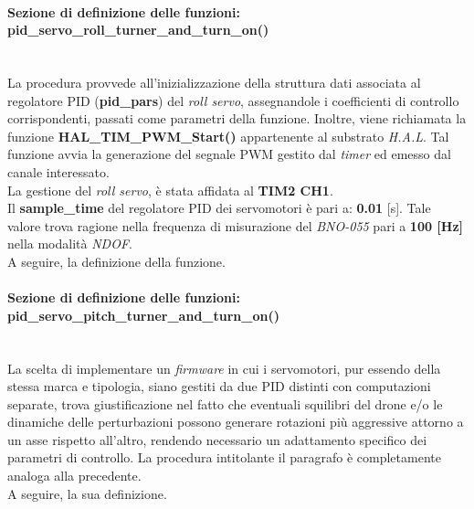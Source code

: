 \paragraph{Sezione di definizione delle funzioni: pid\_servo\_roll\_turner\_and\_turn\_on()}\mbox{}\\
\label{pidServoTurnerTurnOn}
La procedura provvede all'inizializzazione della struttura dati associata al regolatore PID (\textbf{pid\_pars}) del \textit{roll servo}, assegnandole i coefficienti di controllo corrispondenti, passati come parametri della funzione.
Inoltre, viene richiamata la funzione \textbf{HAL\_TIM\_PWM\_Start()} appartenente al substrato \textit{H.A.L}. Tal funzione avvia la generazione del segnale PWM gestito dal \textit{timer} ed emesso dal canale interessato.\\
La gestione del \textit{roll servo}, è stata affidata al \textbf{TIM2 CH1}.\\
Il \textbf{sample\_time} del regolatore PID dei servomotori è pari a: \textbf{0.01} [s]. Tale valore trova ragione nella frequenza di misurazione del \textit{BNO-055} pari a \textbf{100 [Hz]} nella modalità \textit{NDOF}.\\
A seguire, la definizione della funzione.


\paragraph{Sezione di definizione delle funzioni: pid\_servo\_pitch\_turner\_and\_turn\_on()}\mbox{}\\
La scelta di implementare un \textit{firmware} in cui i servomotori, pur essendo della stessa marca e tipologia, siano gestiti da due PID distinti con computazioni separate, trova giustificazione nel fatto che eventuali squilibri del drone e/o le
dinamiche delle perturbazioni possono generare rotazioni più aggressive attorno a un asse rispetto all'altro, rendendo necessario un adattamento specifico dei parametri di controllo.
La procedura intitolante il paragrafo è completamente analoga alla precedente.\\
A seguire, la sua definizione.


